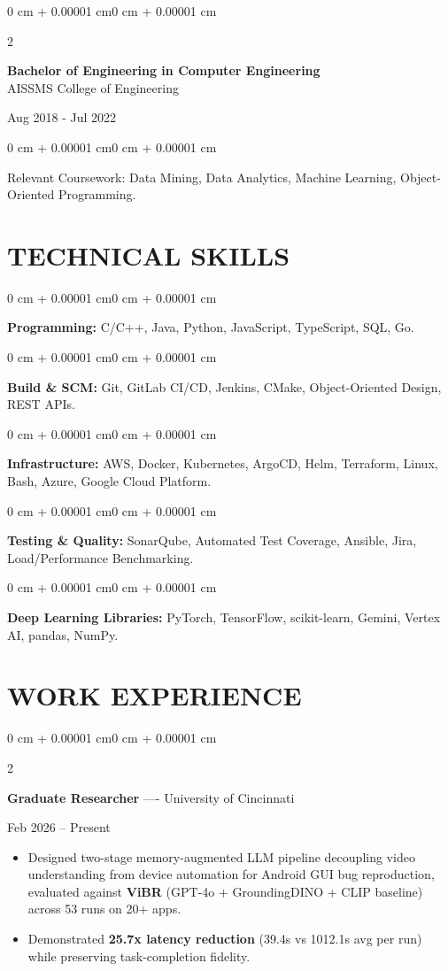 \documentclass[10pt, letterpaper]{article}
\newenvironment{highlights}{
    \begin{itemize}[
        topsep=0.10 cm,
        parsep=0.06 cm,
        partopsep=0pt,
        itemsep=0.06 cm,
        leftmargin=12pt
    ]
}{
    \end{itemize}
}
\newenvironment{onecolentry}{
    \begin{adjustwidth}{0 cm + 0.00001 cm}{0 cm + 0.00001 cm}
}{
    \end{adjustwidth}
}
\newenvironment{twocolentry}[2][]{
    \onecolentry
    \def\secondColumn{#2}
    \setcolumnwidth{\fill, 4.5 cm}
    \begin{paracol}{2}
}{
    \switchcolumn \raggedleft \secondColumn
    \end{paracol}
    \endonecolentry
}
\begin{document}
\begin{twocolentry}{
    Aug 2018 - Jul 2022
}
    \textbf{Bachelor of Engineering in Computer Engineering} \\
    AISSMS College of Engineering
\end{twocolentry}
\begin{onecolentry}
Relevant Coursework: Data Mining, Data Analytics, Machine Learning, Object-Oriented Programming.
\end{onecolentry}
\section{TECHNICAL SKILLS}
\begin{onecolentry}
\textbf{Programming:} C/C++, Java, Python, JavaScript, TypeScript, SQL, Go.
\end{onecolentry}
\vspace{0.06 cm}
\begin{onecolentry}
\textbf{Build \& SCM:} Git, GitLab CI/CD, Jenkins, CMake, Object-Oriented Design, REST APIs.
\end{onecolentry}
\vspace{0.06 cm}
\begin{onecolentry}
\textbf{Infrastructure:} AWS, Docker, Kubernetes, ArgoCD, Helm, Terraform, Linux, Bash, Azure, Google Cloud Platform.
\end{onecolentry}
\vspace{0.06 cm}
\begin{onecolentry}
\textbf{Testing \& Quality:} SonarQube, Automated Test Coverage, Ansible, Jira, Load/Performance Benchmarking.
\end{onecolentry}
\vspace{0.06 cm}
\begin{onecolentry}
\textbf{Deep Learning Libraries:} PyTorch, TensorFlow, scikit-learn, Gemini, Vertex AI, pandas, NumPy.
\end{onecolentry}

\section{WORK EXPERIENCE}
\begin{twocolentry}{Feb 2026 -- Present}
\textbf{Graduate Researcher} ---- University of Cincinnati
\end{twocolentry}
\begin{highlights}
  \item Designed two-stage memory-augmented LLM pipeline decoupling video understanding from device automation for Android GUI bug reproduction, evaluated against \textbf{ViBR} (GPT-4o + GroundingDINO + CLIP baseline) across 53 runs on 20+ apps.
  \item Demonstrated \textbf{25.7x latency reduction} (39.4s vs 1012.1s avg per run) while preserving task-completion fidelity.
\end{highlights}
\end{document}
